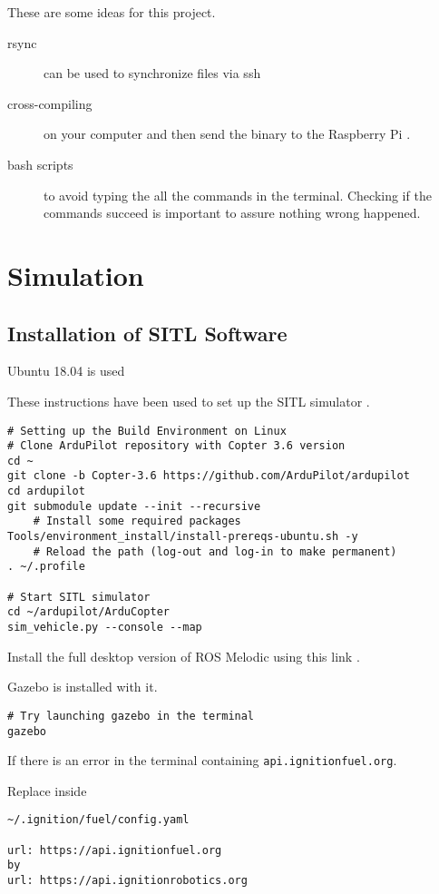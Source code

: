 These are some ideas for this project.
\begin{description}
  \item[rsync] can be used to synchronize files via ssh
  \item[cross-compiling] on your computer and then send the binary to the Raspberry Pi \cite{hackaday_cross_compiling}.
  \item[bash scripts] to avoid typing the all the commands in the terminal. Checking if the commands succeed is important to assure nothing wrong happened. \cite{ryanstutorials_bash_scripting}
\end{description}

\section{Simulation}

\subsection{Installation of SITL Software}
Ubuntu 18.04 is used

These instructions have been used to set up the SITL simulator \cite{ardupilot_sitl}.

\begin{verbatim}
# Setting up the Build Environment on Linux
# Clone ArduPilot repository with Copter 3.6 version
cd ~
git clone -b Copter-3.6 https://github.com/ArduPilot/ardupilot
cd ardupilot
git submodule update --init --recursive
    # Install some required packages
Tools/environment_install/install-prereqs-ubuntu.sh -y
    # Reload the path (log-out and log-in to make permanent)
. ~/.profile

# Start SITL simulator
cd ~/ardupilot/ArduCopter
sim_vehicle.py --console --map
\end{verbatim}

Install the full desktop version of ROS Melodic using this link \cite{ros_install}.

Gazebo is installed with it.

\begin{verbatim}
# Try launching gazebo in the terminal
gazebo
            \end{verbatim}

If there is an error in the terminal containing \texttt{api.ignitionfuel.org}.

Replace inside
\begin{verbatim}
~/.ignition/fuel/config.yaml

url: https://api.ignitionfuel.org
by
url: https://api.ignitionrobotics.org
\end{verbatim}


